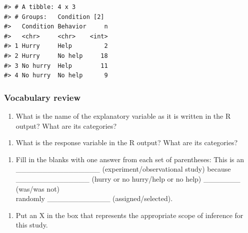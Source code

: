 \documentclass[
]{report}
\providecommand{\tightlist}{%
  \setlength{\itemsep}{0pt}\setlength{\parskip}{0pt}}
\begin{document}
\begin{verbatim}
#> # A tibble: 4 x 3
#> # Groups:   Condition [2]
#>   Condition Behavior     n
#>   <chr>     <chr>    <int>
#> 1 Hurry     Help         2
#> 2 Hurry     No help     18
#> 3 No hurry  Help        11
#> 4 No hurry  No help      9
\end{verbatim}

\hypertarget{vocabulary-review-1}{%
\subsubsection*{Vocabulary review}\label{vocabulary-review-1}}

\begin{enumerate}
\def\labelenumi{\arabic{enumi}.}
\tightlist
\item
  What is the name of the explanatory variable as it is written in the R output? What are its categories?
\end{enumerate}

\vspace{0.2in}

\begin{enumerate}
\def\labelenumi{\arabic{enumi}.}
\setcounter{enumi}{1}
\tightlist
\item
  What is the response variable in the R output? What are its categories?
\end{enumerate}

\vspace{0.2in}


\begin{enumerate}
\def\labelenumi{\arabic{enumi}.}
\setcounter{enumi}{2}
\tightlist
\item
  Fill in the blanks with one answer from each set of parentheses: This is an\\
  \_\_\_\_\_\_\_\_\_\_\_\_\_\_\_\_ (experiment/observational study) because\\
  \_\_\_\_\_\_\_\_\_\_\_\_\_\_ (hurry or no hurry/help or no help) \_\_\_\_\_\_\_ (was/was not)\\
  randomly \_\_\_\_\_\_\_\_\_\_\_\_ (assigned/selected).
\end{enumerate}

\vspace{0.1in}

\begin{enumerate}
\def\labelenumi{\arabic{enumi}.}
\setcounter{enumi}{3}
\tightlist
\item
  Put an X in the box that represents the appropriate scope of inference for this study.
\end{enumerate}
\end{document}
